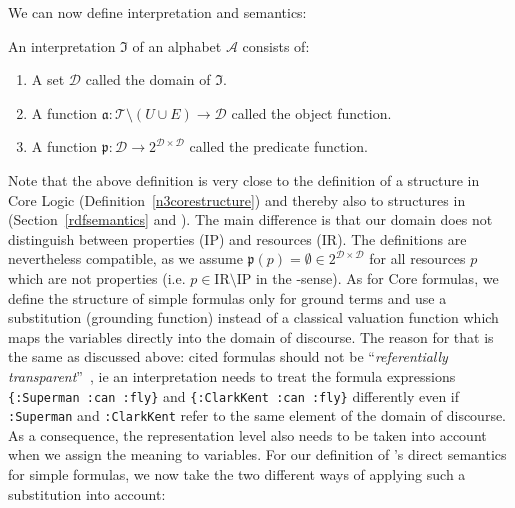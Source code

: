 We can now define interpretation and semantics:

\begin{definition}[Interpretation]
An interpretation $\mathfrak{I}$ of
an \nthree alphabet $\mathcal{A}$ consists of:
\begin{enumerate}
\item A set $\mathcal{D}$ called the domain of $\mathfrak{I}$.
\item A function $\mathfrak{a}: 
\mathcal{T}\setminus (U\cup E) \rightarrow \mathcal{D}$ called the object function.
\item A function $\mathfrak{p}:
\mathcal{D} \rightarrow 2^{\mathcal{D} \times \mathcal{D}}$ called the predicate function.
\end{enumerate}
\end{definition}

Note that the above definition is very close to the definition of a structure in \nthree Core Logic (Definition~\ref{n3corestructure}) 
and thereby also to structures in \rdf (Section~\ref{rdfsemantics} and \cite{RDFSemantics}).
The main difference is that our domain does not distinguish between properties (IP) 
and resources (IR). 
The definitions are nevertheless compatible, as we assume $\mathfrak{p}(p)=\emptyset\in 2^{\mathcal{D} \times \mathcal{D}}$
for all resources $p$ which are not properties (i.e. $p \in \text{IR}\setminus \text{IP}$ in the \rdf-sense). 
% 
As for \nthree Core formulas, we define the structure of simple \nthree formulas only for ground terms and use a substitution (grounding function) instead of a classical valuation 
function which maps the variables directly into the domain of discourse. The reason for that is the same as discussed above: cited formulas should not be ``\emph{referentially transparent}''~\cite[p.7]{N3Logic}, ie 
an interpretation needs to treat the formula expressions \texttt{\{:Superman :can :fly\}} and \texttt{\{:ClarkKent :can :fly\}} differently even if \texttt{:Superman} and \texttt{:ClarkKent} refer to the same 
element of the domain of discourse. As a consequence, the representation level also needs to be taken into account when we assign the meaning to variables.
For our definition of \nthree's direct semantics for simple formulas, we now take the two different ways of applying such a substitution into account:





